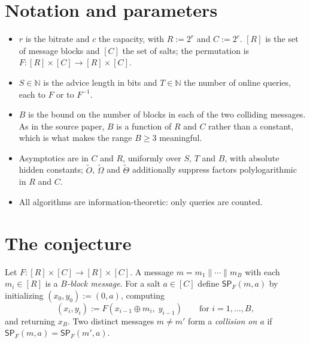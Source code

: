\documentclass{aicr-conjecture}
\newcommand{\SP}{\mathsf{SP}}
\newcommand{\tO}{\tilde{O}}
\newcommand{\tOm}{\tilde{\Omega}}
\newcommand{\tTh}{\tilde{\Theta}}
\begin{document}
\section{Notation and parameters}\label{sec:notation}

\begin{itemize}
\item $r$ is the bitrate and $c$ the capacity, with $R := 2^{r}$ and
  $C := 2^{c}$. $[R]$ is the set of message blocks and $[C]$ the set of
  salts; the permutation is $F : [R] \times [C] \to [R] \times [C]$.
\item $S \in \mathbb{N}$ is the advice length in bits and
  $T \in \mathbb{N}$ the number of online queries, each to $F$ or to
  $F^{-1}$.
\item $B$ is the bound on the number of blocks in each of the two
  colliding messages. As in the source paper, $B$ is a function of $R$
  and $C$ rather than a constant, which is what makes the range
  $B \ge 3$ meaningful.
\item Asymptotics are in $C$ and $R$, uniformly over $S$, $T$ and $B$,
  with absolute hidden constants; $\tO$, $\tOm$ and $\tTh$ additionally
  suppress factors polylogarithmic in $R$ and $C$.
\item All algorithms are information-theoretic: only queries are
  counted.
\end{itemize}

\section{The conjecture}\label{sec:conjectures}

\begin{definition}\label{def:sponge}
Let $F : [R] \times [C] \to [R] \times [C]$. A message
$m = m_{1} \| \cdots \| m_{B}$ with each $m_{i} \in [R]$ is a
\emph{$B$-block message}. For a salt $a \in [C]$ define $\SP_{F}(m,a)$
by initializing $(x_{0}, y_{0}) := (0, a)$, computing
\[
  (x_{i}, y_{i}) := F(x_{i-1} \oplus m_{i},\; y_{i-1})
  \qquad \text{for } i = 1, \dots, B,
\]
and returning $x_{B}$. Two distinct messages $m \ne m'$ form a
\emph{collision on $a$} if $\SP_{F}(m,a) = \SP_{F}(m',a)$.
\end{definition}
\end{document}
